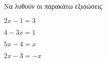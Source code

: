 Να λυθούν οι παρακάτω εξισώσεις
\begin{rlist}
\begin{multicols}{2}
\item $ 2x-1=3 $
\item $ 4-3x=1 $
\item $ 5x-4=x $
\item $ 2x-3=-x $
\end{multicols}
\end{rlist}
